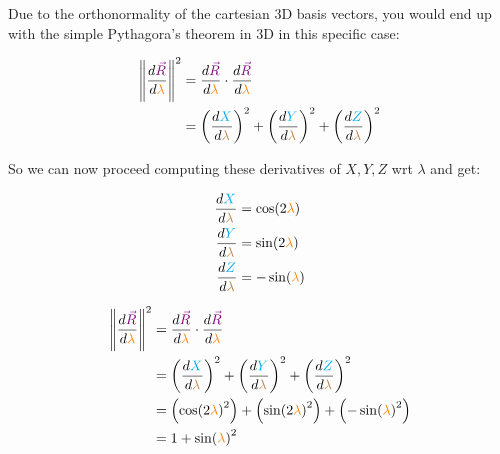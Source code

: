 Due to the orthonormality of the cartesian 3D basis vectors, you would end up with the simple Pythagora's theorem in 3D in this specific case:

\begin{align*}
    \norm{\frac{d\begingroup\color{violet}\vec{R}\endgroup}{d\begingroup\color{orange}\lambda\endgroup}}^2 &=
    \frac{d\begingroup\color{violet}\vec{R}\endgroup}{d\begingroup\color{orange}\lambda\endgroup} \cdot \frac{d\begingroup\color{violet}\vec{R}\endgroup}{d\begingroup\color{orange}\lambda\endgroup}\\
    &= \left(\frac{d \begingroup\color{cyan}X\endgroup}{d \begingroup\color{brown}\lambda\endgroup}\right)^2 
    + \left(\frac{d \begingroup\color{cyan}Y\endgroup}{d \begingroup\color{brown}\lambda\endgroup}\right)^2
    + \left(\frac{d \begingroup\color{cyan}Z\endgroup}{d \begingroup\color{brown}\lambda\endgroup}\right)^2
\end{align*}

So we can now proceed computing these derivatives of $X, Y, Z$ wrt $\lambda$ and get:

\begin{align*}
    \frac{d \begingroup\color{cyan}X\endgroup}{d \begingroup\color{brown}\lambda\endgroup} &= 
    \cos(2\begingroup\color{orange}\lambda\endgroup)\\
    \frac{d \begingroup\color{cyan}Y\endgroup}{d \begingroup\color{brown}\lambda\endgroup} &= 
    \sin(2\begingroup\color{orange}\lambda\endgroup)\\
    \frac{d \begingroup\color{cyan}Z\endgroup}{d \begingroup\color{brown}\lambda\endgroup} &= 
    -\sin(\begingroup\color{orange}\lambda\endgroup)
\end{align*}

\begin{align*}
    \norm{\frac{d\begingroup\color{violet}\vec{R}\endgroup}{d\begingroup\color{orange}\lambda\endgroup}}^2 &=
    \frac{d\begingroup\color{violet}\vec{R}\endgroup}{d\begingroup\color{orange}\lambda\endgroup} \cdot \frac{d\begingroup\color{violet}\vec{R}\endgroup}{d\begingroup\color{orange}\lambda\endgroup}\\
    &= \left(\frac{d \begingroup\color{cyan}X\endgroup}{d \begingroup\color{brown}\lambda\endgroup}\right)^2 
    + \left(\frac{d \begingroup\color{cyan}Y\endgroup}{d \begingroup\color{brown}\lambda\endgroup}\right)^2
    + \left(\frac{d \begingroup\color{cyan}Z\endgroup}{d \begingroup\color{brown}\lambda\endgroup}\right)^2\\
    &= \left(\cos(2\begingroup\color{orange}\lambda\endgroup)^2\right)
    + \left(\sin(2\begingroup\color{orange}\lambda\endgroup)^2\right)
    + \left(-\sin(\begingroup\color{orange}\lambda\endgroup)^2\right)\\
    &= 1 + \sin(\begingroup\color{orange}\lambda\endgroup)^2
\end{align*}

